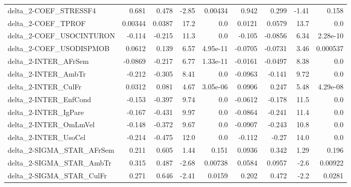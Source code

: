 \begin{tabular}{lrrrrrrrr}
delta\_2-COEF\_STRESSF4                 &       0.681 &        0.478 &   -2.85 &  0.00434 &      0.942 &       0.299 &        -1.41 &         0.158 \\
delta\_2-COEF\_TPROF                    &     0.00344 &       0.0387 &    17.2 &      0.0 &     0.0121 &      0.0579 &         13.7 &           0.0 \\
delta\_2-COEF\_USOCINTURON              &      -0.114 &       -0.215 &    11.3 &      0.0 &     -0.105 &     -0.0856 &         6.34 &      2.28e-10 \\
delta\_2-COEF\_USODISPMOB               &      0.0612 &        0.139 &    6.57 & 4.95e-11 &    -0.0705 &     -0.0731 &         3.46 &      0.000537 \\
delta\_2-INTER\_AFrSem                  &     -0.0869 &       -0.217 &    6.77 & 1.33e-11 &    -0.0161 &     -0.0497 &         8.38 &           0.0 \\
delta\_2-INTER\_AmbTr                   &      -0.212 &       -0.305 &    8.41 &      0.0 &    -0.0963 &      -0.141 &         9.72 &           0.0 \\
delta\_2-INTER\_CulFr                   &      0.0312 &        0.081 &    4.67 & 3.05e-06 &     0.0906 &       0.247 &         5.48 &      4.29e-08 \\
delta\_2-INTER\_EnfCond                 &      -0.153 &       -0.397 &    9.74 &      0.0 &    -0.0612 &      -0.178 &         11.5 &           0.0 \\
delta\_2-INTER\_IgPare                  &      -0.167 &       -0.431 &    9.97 &      0.0 &    -0.0864 &      -0.241 &         11.4 &           0.0 \\
delta\_2-INTER\_OmLmVel                 &      -0.148 &       -0.372 &    9.67 &      0.0 &    -0.0907 &      -0.243 &         10.8 &           0.0 \\
delta\_2-INTER\_UsoCel                  &      -0.214 &       -0.475 &    12.0 &      0.0 &     -0.112 &       -0.27 &         14.0 &           0.0 \\
delta\_2-SIGMA\_STAR\_AFrSem             &       0.211 &        0.605 &    1.44 &    0.151 &     0.0936 &       0.342 &         1.29 &         0.196 \\
delta\_2-SIGMA\_STAR\_AmbTr              &       0.315 &        0.487 &   -2.68 &  0.00738 &     0.0584 &      0.0957 &         -2.6 &       0.00922 \\
delta\_2-SIGMA\_STAR\_CulFr              &       0.271 &        0.646 &   -2.41 &   0.0159 &      0.202 &       0.472 &         -2.2 &        0.0281 \\

\end{tabular}
